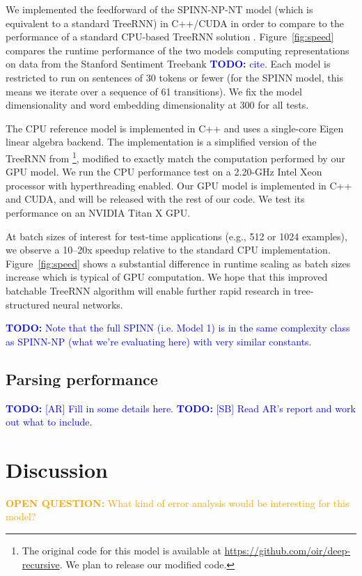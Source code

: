 \documentclass[11pt]{article}
\newcommand\todo[1]{\textcolor{blue}{\textbf{TODO:} #1}}
\newcommand\question[1]{\textcolor{orange}{\textbf{OPEN QUESTION:} #1}}
\begin{document}
We implemented the feedforward of the SPINN-NP-NT model (which is equivalent to a standard TreeRNN) in C++/CUDA in order to compare to the performance of a standard CPU-based TreeRNN solution \cite{irsoy2014deep}. Figure~\ref{fig:speed} compares the runtime performance of the two models computing representations on data from the Stanford Sentiment Treebank \todo{cite}. Each model is restricted to run on sentences of 30 tokens or fewer (for the SPINN model, this means we iterate over a sequence of 61 transitions). We fix the model dimensionality and word embedding dimensionality at 300 for all tests.

The CPU reference model is implemented in C++ and uses a single-core Eigen linear algebra backend. The implementation is a simplified version of the TreeRNN from \citealt{irsoy2014deep}\footnote{The original code for this model is available at \url{https://github.com/oir/deep-recursive}. We plan to release our modified code.}, modified to exactly match the computation performed by our GPU model. We run the CPU performance test on a 2.20-GHz Intel Xeon processor with hyperthreading enabled. Our GPU model is implemented in C++ and CUDA, and will be released with the rest of our code. We test its performance on an NVIDIA Titan X GPU.

At batch sizes of interest for test-time applications (e.g., 512 or 1024 examples), we observe a 10--20x speedup relative to the standard CPU implementation. Figure~\ref{fig:speed} shows a substantial difference in runtime scaling as batch sizes increase which is typical of GPU computation. We hope that this improved batchable TreeRNN algorithm will enable further rapid research in tree-structured neural networks.

\todo{Note that the full SPINN (i.e. Model 1) is in the same complexity class as SPINN-NP (what we're evaluating here) with very similar constants.}

\subsection{Parsing performance}

\todo{[AR] Fill in some details here.}
\todo{[SB] Read AR's report and work out what to include.}

\section{Discussion}

\question{What kind of error analysis would be interesting for this model?}
\end{document}
